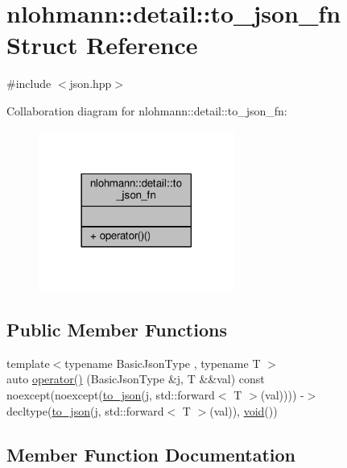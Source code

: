 \hypertarget{structnlohmann_1_1detail_1_1to__json__fn}{}\section{nlohmann\+:\+:detail\+:\+:to\+\_\+json\+\_\+fn Struct Reference}
\label{structnlohmann_1_1detail_1_1to__json__fn}


{\ttfamily \#include $<$json.\+hpp$>$}



Collaboration diagram for nlohmann\+:\+:detail\+:\+:to\+\_\+json\+\_\+fn\+:
\nopagebreak
\begin{figure}[H]
\begin{center}
\leavevmode
\includegraphics[width=182pt]{structnlohmann_1_1detail_1_1to__json__fn__coll__graph}
\end{center}
\end{figure}
\subsection*{Public Member Functions}
\begin{DoxyCompactItemize}
\item 
{\footnotesize template$<$typename Basic\+Json\+Type , typename T $>$ }\\auto \hyperlink{structnlohmann_1_1detail_1_1to__json__fn_aecfb5114c8a737fc89d98589482795b8}{operator()} (Basic\+Json\+Type \&j, T \&\&val) const noexcept(noexcept(\hyperlink{namespacenlohmann_1_1detail_a1a804b98cbe89b7e44b698f2ca860490}{to\+\_\+json}(j, std\+::forward$<$ T $>$(val)))) -\/$>$ decltype(\hyperlink{namespacenlohmann_1_1detail_a1a804b98cbe89b7e44b698f2ca860490}{to\+\_\+json}(j, std\+::forward$<$ T $>$(val)), \hyperlink{namespacenlohmann_1_1detail_a59fca69799f6b9e366710cb9043aa77d}{void}())
\end{DoxyCompactItemize}


\subsection{Member Function Documentation}

